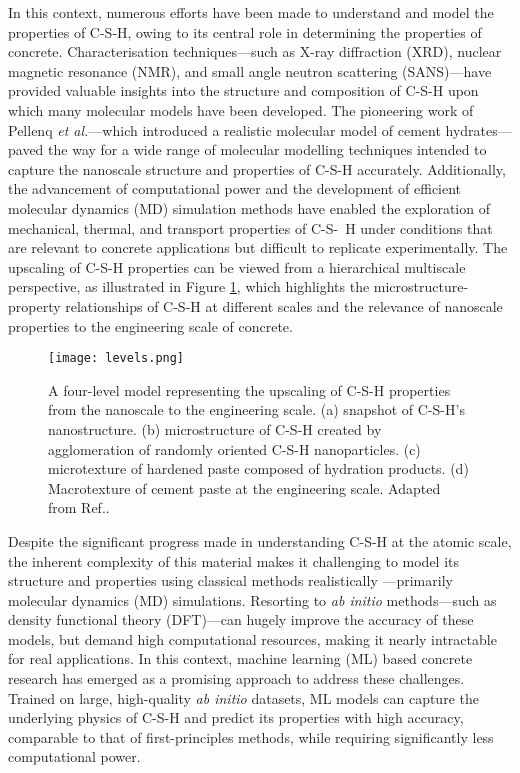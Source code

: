 In this context, numerous efforts have been made to understand and model the properties of C-S-H, owing to its central role in determining the properties of concrete\supercite{Ji2012, Papatzani2015, Qomi2020}. Characterisation techniques---such as X-ray diffraction (XRD)\supercite{Allen2007, Houston2009, Oh2012}, nuclear magnetic resonance (NMR)\supercite{Foley2012, Maddalena2019}, and small angle neutron scattering (SANS)---have provided valuable insights into the structure and composition of C-S-H upon which many molecular models have been developed. The pioneering work of Pellenq \emph{et al.}\supercite{Pellenq2009}---which introduced a realistic molecular model of cement hydrates---paved the way for a wide range of molecular modelling techniques\supercite{AbdolhosseiniQomi2014, Richardson2014, Bauchy2014, Kovacevic2016, KunhiMohamed2018} intended to capture the nanoscale structure and properties of C-S-H accurately. Additionally, the advancement of computational power and the development of efficient molecular dynamics (MD) simulation methods have enabled the exploration of mechanical, thermal, and transport properties of C-S-~H\supercite{
AbdolhosseiniQomi2015, Bahraq2022, Cho2020, Barbhuiya2023} under conditions that are relevant to concrete applications but difficult to replicate experimentally. The upscaling of C-S-H properties can be viewed from a hierarchical multiscale perspective, as illustrated in Figure \ref{fig:figure1}, which highlights the microstructure-property relationships of C-S-H at different scales and the relevance of nanoscale properties to the engineering scale of concrete.
\begin{figure}[H]
    \centering
    \texttt{[image: levels.png]}
    \caption{A four-level model representing the upscaling of C-S-H properties from the nanoscale to the engineering scale. (a) snapshot of C-S-H's nanostructure. (b) microstructure of C-S-H created by agglomeration of randomly oriented C-S-H nanoparticles. (c) microtexture of hardened paste composed of hydration products. (d) Macrotexture of cement paste at the engineering scale. Adapted from Ref.\supercite{AbdolhosseiniQomi2015}.}
    \label{fig:figure1}
\end{figure}

Despite the significant progress made in understanding C-S-H at the atomic scale, the inherent complexity of this material makes it challenging to model its structure and properties using classical methods realistically ---primarily molecular dynamics (MD) simulations. Resorting to \emph{ab initio} methods---such as density functional theory (DFT)---can hugely improve the accuracy of these models, but demand high computational resources, making it nearly intractable for real applications\supercite{zotero-item-16}. In this context, machine learning (ML) based concrete research has emerged as a promising approach to address these challenges\supercite{zotero-item-16, Kobayashi2021, Zhu2024}. Trained on large, high-quality \emph{ab initio} datasets, ML models can capture the underlying physics of C-S-H and predict its properties with high accuracy, comparable to that of first-principles methods, while requiring significantly less computational power. 

